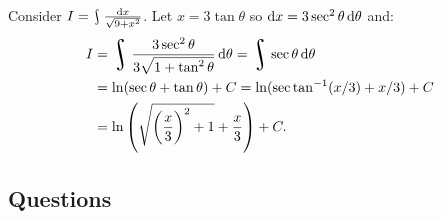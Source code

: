 \begin{ex}
  Consider $ I = \rint \frac{\dif{x}}{\sqrt{9 + x^2}} $. Let $ x = 3\tan\theta $ so $ \dif{x} = 3\sec^2\theta \dif{\theta} $ and:
  \begin{align*}
    I &= \rint \frac{3\sec^2 \theta}{3\sqrt{1 + \tan^2 \theta}} \dif{\theta} = \rint \sec \theta \dif{\theta}\\
      &= \ln(\sec \theta + \tan \theta) + C = \ln(\sec \tan^{-1} (x/3) + x/3) + C\\
      &= \ln\left( \sqrt{\left(\frac{x}{3}\right)^2 + 1} + \frac{x}{3} \right) + C.
  \end{align*}
\end{ex}

\clearpage
\subsection*{Questions}
